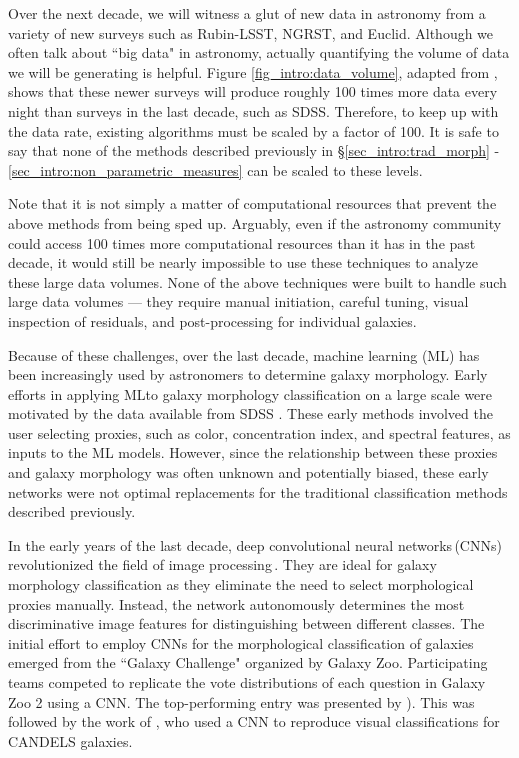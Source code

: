 Over the next decade, we will witness a glut of new data in astronomy from a variety of new surveys such as Rubin-LSST, NGRST, and Euclid. Although we often talk about ``big data" in astronomy, actually quantifying the volume of data we will be generating is helpful. Figure \ref{fig_intro:data_volume}, adapted from \citet{kremer_17}, shows that these newer surveys will produce roughly 100 times more data every night than surveys in the last decade, such as SDSS. Therefore, to keep up with the data rate, existing algorithms must be scaled by a factor of 100. It is safe to say that none of the methods described previously in \S \ref{sec_intro:trad_morph} - \ref{sec_intro:non_parametric_measures} can be scaled to these levels. 

Note that it is not simply a matter of computational resources that prevent the above methods from being sped up. Arguably, even if the astronomy community could access 100 times more computational resources than it has in the past decade, it would still be nearly impossible to use these techniques to analyze these large data volumes. None of the above techniques were built to handle such large data volumes --- they require manual initiation, careful tuning, visual inspection of residuals, and post-processing for individual galaxies. 

Because of these challenges, over the last decade, machine learning (ML) has been increasingly used by astronomers to determine galaxy morphology. Early efforts in applying MLto galaxy morphology classification on a large scale were motivated by the data available from SDSS \citep[e.g.,][]{Ball2004GalaxyNetworks,Kelly2004MorphologicalSurvey,banerji_10}. These early methods involved the user selecting proxies, such as color, concentration index, and spectral features, as inputs to the ML models. However, since the relationship between these proxies and galaxy morphology was often unknown and potentially biased, these early networks were not optimal replacements for the traditional classification methods described previously. 

In the early years of the last decade, deep  convolutional neural networks\,(CNNs) revolutionized the field of image processing\,\citep[see][for an overview]{dl_1}. They are ideal for galaxy morphology classification as they eliminate the need to select morphological proxies manually. Instead, the network autonomously determines the most discriminative image features for distinguishing between different classes. The initial effort to employ CNNs for the morphological classification of galaxies emerged from the ``Galaxy Challenge" organized by Galaxy Zoo. Participating teams competed to replicate the vote distributions of each question in Galaxy Zoo 2 using a CNN. The top-performing entry was presented by \citealp{Dieleman2015Rotation-invariantPrediction}). This was followed by the work of \citet{Huertas-Company2015ALEARNING}, who used a CNN to reproduce visual classifications for CANDELS galaxies.

